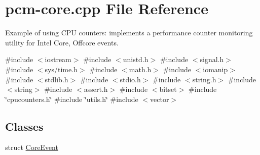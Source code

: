 \hypertarget{pcm-core_8cpp}{}\section{pcm-\/core.cpp File Reference}
\label{pcm-core_8cpp}


Example of using C\+PU counters\+: implements a performance counter monitoring utility for Intel Core, Offcore events.  


{\ttfamily \#include $<$iostream$>$}\newline
{\ttfamily \#include $<$unistd.\+h$>$}\newline
{\ttfamily \#include $<$signal.\+h$>$}\newline
{\ttfamily \#include $<$sys/time.\+h$>$}\newline
{\ttfamily \#include $<$math.\+h$>$}\newline
{\ttfamily \#include $<$iomanip$>$}\newline
{\ttfamily \#include $<$stdlib.\+h$>$}\newline
{\ttfamily \#include $<$stdio.\+h$>$}\newline
{\ttfamily \#include $<$string.\+h$>$}\newline
{\ttfamily \#include $<$string$>$}\newline
{\ttfamily \#include $<$assert.\+h$>$}\newline
{\ttfamily \#include $<$bitset$>$}\newline
{\ttfamily \#include \char`\"{}cpucounters.\+h\char`\"{}}\newline
{\ttfamily \#include \char`\"{}utils.\+h\char`\"{}}\newline
{\ttfamily \#include $<$vector$>$}\newline
\subsection*{Classes}
\begin{DoxyCompactItemize}
\item 
struct \mbox{\hyperlink{struct_core_event}{Core\+Event}}
\end{DoxyCompactItemize}
